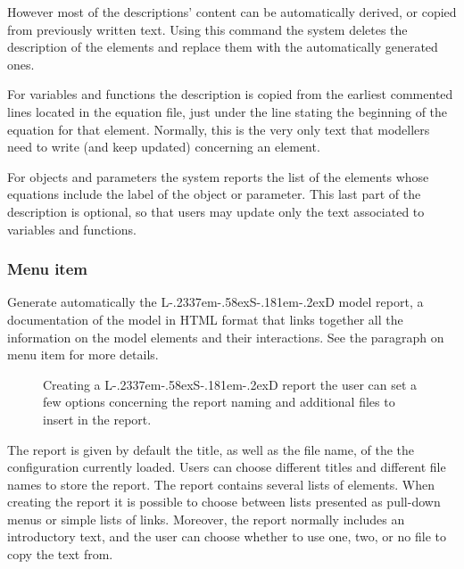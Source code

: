 \documentclass [11pt,a4paper] {book}
\def\LsD{{L\kern-.2337em\lower-.58ex\hbox{S}\kern-.181em\lower-.2ex\hbox{D}}\xspace}
\begin{document}
However most of the descriptions' content can be automatically derived, or copied from previously written text. Using this command the system deletes the description of the elements and replace them with the automatically generated ones.

For variables and functions the description is copied from the earliest commented lines located in the equation file, just under the line stating the beginning of the equation for that element. Normally, this is the very only text that modellers need to write (and keep updated) concerning an element.

For objects and parameters the system reports the list of the elements whose equations include the label of the object or parameter. This last part of the description is optional, so that users may update only the text associated to variables and functions.

\subsubsection{Menu item  }

Generate automatically the \LsD model report, a documentation of the model in HTML format that links together all the information on the model elements and their interactions. See the paragraph on menu item  for more details.

\begin{figure}[ht]
  \centering
  \caption{Creating a \LsD report the user can set a few options concerning the report naming and additional files to insert in the report.}
  \label{fig:create_report}
\end{figure}

The report is given by default the title, as well as the file name, of the the configuration currently loaded. Users can choose different titles and different file names to store the report. The report contains several lists of elements. When creating the report it is possible to choose between lists presented as pull-down menus or simple lists of links. Moreover, the report normally includes an introductory text, and the user can choose whether to use one, two, or no file to copy the text from.
\end{document}
